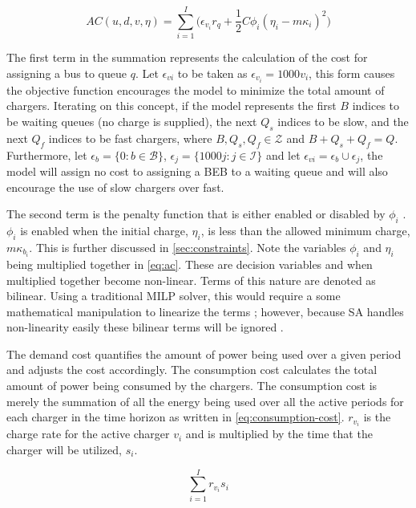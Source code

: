 \documentclass[11pt,a4paper,final]{article}
\newcommand{\AC}{AC(u, d, v, \eta)}         %
\newcommand{\Iset}{\mathcal{I}}             %
\newcommand{\Bset}{\mathcal{B}}             %
\begin{document}
\begin{equation}
\label{eq:ac}
\AC = \sum_{i=1}^I \Big(\epsilon_{v_i}r_q + \frac{1}{2} C \phi_i (\eta_i - m \kappa_i)^{2}\Big)
\end{equation}

The first term in the summation represents the calculation of the cost for assigning a bus to queue \(q\). Let \(\epsilon_{vi}\) to
be taken as \(\epsilon_{v_i} = 1000v_i\), this form causes the objective function encourages the model to minimize the total
amount of chargers. Iterating on this concept, if the model represents the first \(B\) indices to be waiting queues (no
charge is supplied), the next \(Q_s\) indices to be slow, and the next \(Q_f\) indices to be fast chargers, where \(B, Q_s,
Q_f \in \mathcal{Z}\) and \(B + Q_s + Q_f = Q\). Furthermore, let \(\epsilon_b = \{ 0 : b \in \Bset \}\), \(\epsilon_{j} = \{ 1000 j: j \in \Iset \}\) and let
\(\epsilon_{vi} = \epsilon_b \cup \epsilon_j\), the model will assign no cost to assigning a BEB to a waiting queue and will also encourage the
use of slow chargers over fast.

The second term is the penalty function that is either enabled or disabled by \(\phi_i\)
\cite{luenberger-2008-penal-barrier-method}. \(\phi_i\) is enabled when the initial charge, \(\eta_i\), is less than the allowed
minimum charge, \(m\kappa_{b_i}\). This is further discussed in \ref{sec:constraints}. Note the variables \(\phi_i\) and \(\eta_i\) being
multiplied together in \ref{eq:ac}. These are decision variables and when multiplied together become non-linear. Terms of this
nature are denoted as bilinear. Using a traditional MILP solver, this would require a some mathematical manipulation to
linearize the terms \cite{rodriguez-2013-compar-asses}; however, because SA handles non-linearity easily these bilinear
terms will be ignored \cite{radosavljevic-2018-metah-optim}.

The demand cost quantifies the amount of power being used over a given period and adjusts the cost accordingly. The
consumption cost calculates the total amount of power being consumed by the chargers. The consumption cost is merely the
summation of all the energy being used over all the active periods for each charger in the time horizon as written in
\ref{eq:consumption-cost}. \(r_{v_i}\) is the charge rate for the active charger \(v_i\) and is multiplied by the time that the
charger will be utilized, \(s_i\).

\begin{equation}
\label{eq:consumption-cost}
  \sum_{i=1}^I r_{v_i}s_i
\end{equation}
\end{document}
